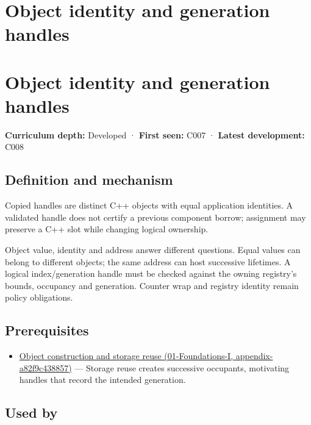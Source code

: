 \hypertarget{appendix-f1581457d322}{}
\section*{Object identity and generation handles}
\section{Object identity and generation handles}\label{appendix-f1581457d322-object-identity-and-generation-handles}

\textbf{Curriculum depth:} Developed · \textbf{First seen:} C007 · \textbf{Latest development:} C008

\subsection{Definition and mechanism}\label{appendix-f1581457d322-definition-and-mechanism}

Copied handles are distinct C++ objects with equal application identities. A validated handle does not certify a previous component borrow; assignment may preserve a C++ slot while changing logical ownership.

Object value, identity and address answer different questions. Equal values can belong to different objects; the same address can host successive lifetimes. A logical index/generation handle must be checked against the owning registry's bounds, occupancy and generation. Counter wrap and registry identity remain policy obligations.

\subsection{Prerequisites}\label{appendix-f1581457d322-prerequisites}

\begin{itemize}
\tightlist
\item
  \href{../01-Foundations-I/main.pdf\#nameddest=appendix-a82f9c438857}{Object construction and storage reuse (01-Foundations-I, appendix-a82f9c438857)} --- Storage reuse creates successive occupants, motivating handles that record the intended generation.
\end{itemize}

\subsection{Used by}\label{appendix-f1581457d322-used-by}

